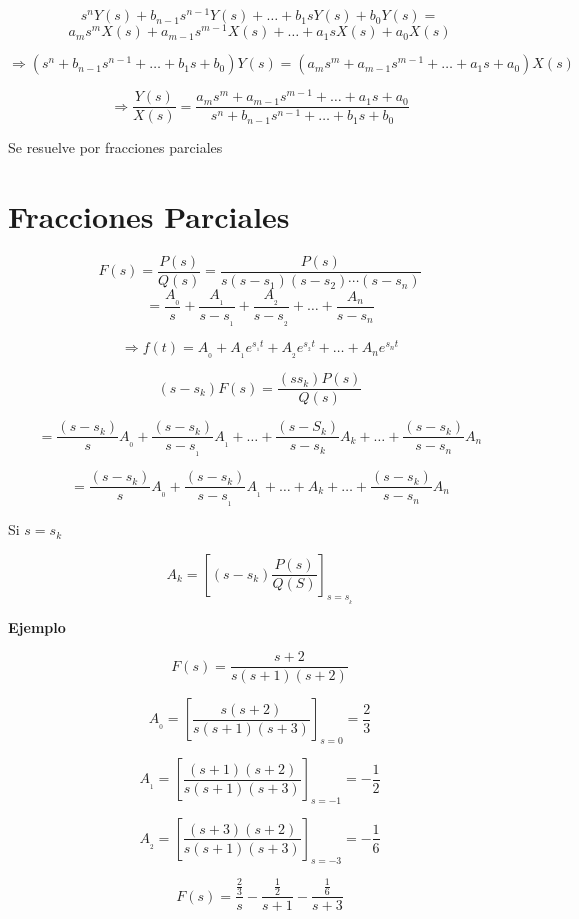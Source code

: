 $$s^{n}Y(s) + b_{n - 1}s^{n - 1}Y(s) + \ldots + b_{1}sY(s) + b_{0}Y(s) = $$
$$a_{m}s^{m}X(s) + a_{m - 1}s^{m - 1}X(s) + \ldots + a_{1}sX(s) + a_{0}X(s)$$

$$\Rightarrow (s^n + b_{n - 1} s^{n -1} + \ldots + b_{1}s + b_{0}) Y(s) = (a_{m}s^m + a_{m - 1}s^{m - 1} + \ldots + a_{1}s + a_{0})X(s)$$

$$\Rightarrow \dfrac{Y(s)}{X(s)} = \dfrac{a_{m}s^m + a_{m - 1}s^{m - 1} + \ldots + a_{1}s + a_{0}}{s^n + b_{n - 1} s^{n -1} + \ldots + b_{1}s + b_{0}}$$

Se resuelve por fracciones parciales

\section{Fracciones Parciales}

$$F(s) = \dfrac{P(s)}{Q(s)} = \dfrac{P(s)}{s(s - s_{1})(s - s_{2})\cdots (s - s_{n})}$$
$$= \dfrac{A_{_0}}{s} + \dfrac{A_{_1}}{s - s_{_1}} + \dfrac{A_{_2}}{s - s_{_2}} + \ldots 
+ \dfrac{A_{n}}{s - s_{n}}$$

$$\Rightarrow f(t) = A_{_0} + A_{_1}e^{s_{_1} t} + A_{_2}e^{s_{_2} t} + \ldots + A_{n}e^{s_{n} t}$$

$$(s - s_{k})F(s) = \dfrac{(s  s_{k})P(s)}{Q(s)}$$

$$= \dfrac{(s - s_{k})}{s}A_{_0} +\dfrac{(s - s_{k})}{s - s_{_1}}A_{_1} + \ldots + \dfrac{(s - S_{k})}{s - s_{k}}A_{k} + \ldots + 
			\dfrac{(s - s_{k})}{s - s_{n}}A_{n}$$

$$= \dfrac{(s - s_{k})}{s}A_{_0} +\dfrac{(s - s_{k})}{s - s_{_1}}A_{_1} + \ldots + A_{k} + \ldots + 
\dfrac{(s - s_{k})}{s - s_{n}}A_{n}$$

Si $s = s_{k}$

$$ A_{k} = \left[ (s - s_{k}) \dfrac{P(s)}{Q(S)} \right]_{s = s_{_k}} $$

\textbf{Ejemplo}

$$F(s) = \dfrac{s + 2}{s(s + 1)(s + 2)}$$

$$A_{_0} = \left[ \dfrac{s(s + 2)}{s(s + 1)(s + 3)} \right]_{s = 0} = \dfrac{2}{3} $$

$$A_{_1} = \left[ \dfrac{(s + 1)(s + 2)}{s(s + 1)(s + 3)} \right]_{s = -1} = - \dfrac{1}{2} $$

$$A_{_2} = \left[ \dfrac{(s + 3)(s + 2)}{s(s + 1)(s + 3)} \right]_{s = -3} = - \dfrac{1}{6} $$

$$F(s) = \dfrac{\frac{2}{3}}{s} - \dfrac{\frac{1}{2}}{s + 1} - \dfrac{\frac{1}{6}}{s + 3}$$

